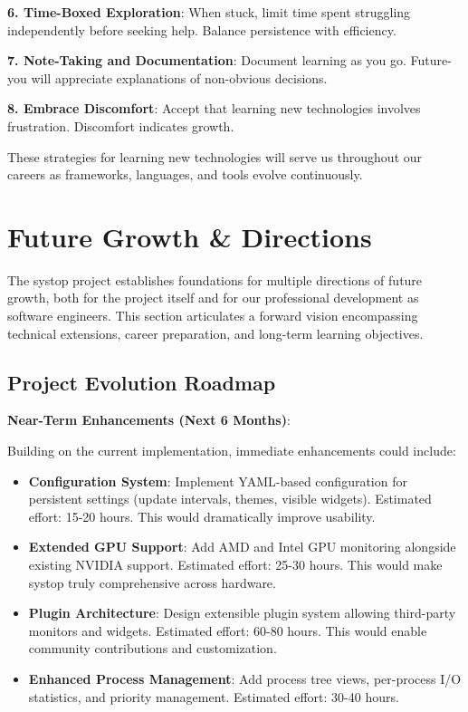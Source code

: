 \documentclass[12pt,a4paper,oneside]{report}
\begin{document}
\textbf{6. Time-Boxed Exploration}: When stuck, limit time spent struggling independently before seeking help. Balance persistence with efficiency.

\textbf{7. Note-Taking and Documentation}: Document learning as you go. Future-you will appreciate explanations of non-obvious decisions.

\textbf{8. Embrace Discomfort}: Accept that learning new technologies involves frustration. Discomfort indicates growth.

These strategies for learning new technologies will serve us throughout our careers as frameworks, languages, and tools evolve continuously.

\section{Future Growth \& Directions}
\label{sec:future-growth}

The systop project establishes foundations for multiple directions of future growth, both for the project itself and for our professional development as software engineers. This section articulates a forward vision encompassing technical extensions, career preparation, and long-term learning objectives.

\subsection{Project Evolution Roadmap}

\textbf{Near-Term Enhancements (Next 6 Months)}:

Building on the current implementation, immediate enhancements could include:

\begin{itemize}
    \item \textbf{Configuration System}: Implement YAML-based configuration for persistent settings (update intervals, themes, visible widgets). Estimated effort: 15-20 hours. This would dramatically improve usability.
    
    \item \textbf{Extended GPU Support}: Add AMD and Intel GPU monitoring alongside existing NVIDIA support. Estimated effort: 25-30 hours. This would make systop truly comprehensive across hardware.
    
    \item \textbf{Plugin Architecture}: Design extensible plugin system allowing third-party monitors and widgets. Estimated effort: 60-80 hours. This would enable community contributions and customization.
    
    \item \textbf{Enhanced Process Management}: Add process tree views, per-process I/O statistics, and priority management. Estimated effort: 30-40 hours.
\end{itemize}
\end{document}

